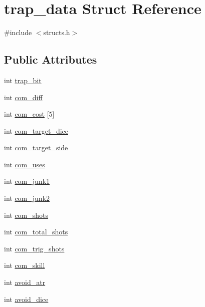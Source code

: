 \hypertarget{structtrap__data}{\section{trap\-\_\-data Struct Reference}
\label{structtrap__data}
}


{\ttfamily \#include $<$structs.\-h$>$}

\subsection*{Public Attributes}
\begin{DoxyCompactItemize}
\item 
int \hyperlink{structtrap__data_a8862ab3a9cdd7a46361828ad2a66f4ea}{trap\-\_\-bit}
\item 
int \hyperlink{structtrap__data_af3019df03bad941a94dd302148fbc9bc}{com\-\_\-diff}
\item 
int \hyperlink{structtrap__data_a7fc8b6dcd536d8d63a5826c571abeb62}{com\-\_\-cost} \mbox{[}5\mbox{]}
\item 
int \hyperlink{structtrap__data_a9c541517f734cc1da551544fa45c447d}{com\-\_\-target\-\_\-dice}
\item 
int \hyperlink{structtrap__data_ab14e1fb2b159a949893e1addbd2ebff7}{com\-\_\-target\-\_\-side}
\item 
int \hyperlink{structtrap__data_a26de1e8bbeb88857f796cc1c6febd6b7}{com\-\_\-uses}
\item 
int \hyperlink{structtrap__data_a91389c44ac1d642e16f3d0d3cec70090}{com\-\_\-junk1}
\item 
int \hyperlink{structtrap__data_a87412179e09e3391a250a325070bb691}{com\-\_\-junk2}
\item 
int \hyperlink{structtrap__data_a71be0cfd4d1a92555b4864c70ed34988}{com\-\_\-shots}
\item 
int \hyperlink{structtrap__data_a6bcc5055e869eed586e647d3f1d5bdf4}{com\-\_\-total\-\_\-shots}
\item 
int \hyperlink{structtrap__data_a80a274af713b0051d8c39d90229ad8fb}{com\-\_\-trig\-\_\-shots}
\item 
int \hyperlink{structtrap__data_a7c2c9b31e8340dd5239da98549dbd7a7}{com\-\_\-skill}
\item 
int \hyperlink{structtrap__data_a2d636d7075a7861fe40343fd535897e4}{avoid\-\_\-atr}
\item 
int \hyperlink{structtrap__data_ac8fea4e9321d61fd328b54ce2a8e3325}{avoid\-\_\-dice}
\item 

\end{DoxyCompactItemize}
